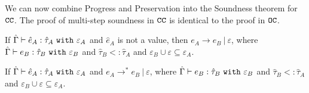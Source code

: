 We can now combine Progress and Preservation into the Soundness theorem for $\mathtt{CC}$. The proof of multi-step soundness in $\mathtt{CC}$ is identical to the proof in $\mathtt{OC}$.

\begin{theorem}
If $\hat \Gamma \vdash \hat e_A: \hat \tau_A~\mathtt{with}~ \varepsilon_A$ and $\hat e_A$ is not a value, then $e_A \longrightarrow e_B~|~\varepsilon$, where $\hat \Gamma \vdash e_B: \hat \tau_B~\mathtt{with}~ \varepsilon_B$ and $\hat \tau_B <: \hat \tau_A$ and $\varepsilon_B \cup \varepsilon \subseteq \varepsilon_A$.
\end{theorem}

\begin{theorem}
If $\hat \Gamma \vdash \hat e_A: \hat \tau_A~\mathtt{with}~ \varepsilon_A$ and $e_A \longrightarrow^{*} e_B~|~\varepsilon$, where $\hat \Gamma \vdash e_B: \hat \tau_B~\mathtt{with}~ \varepsilon_B$ and $\hat \tau_B <: \hat \tau_A$ and $\varepsilon_B \cup \varepsilon \subseteq \varepsilon_A$.
\end{theorem}






